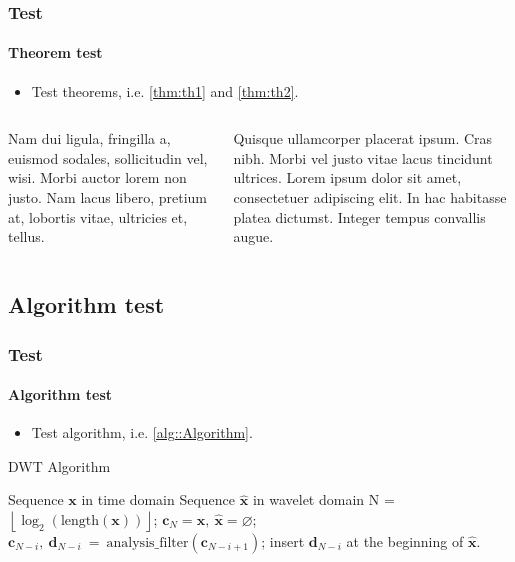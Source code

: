 \documentclass[aspectratio=169,hyperref={implicit=true}]{beamer}
\begin{document}
\begin{frame}

\frametitle{Test}
\framesubtitle{Theorem test}

\begin{itemize}
  \item Test theorems, i.e. \cref{thm:th1} and \cref{thm:th2}.
\end{itemize}

\begin{columns}
  \begin{column}{.44\textwidth}
    \begin{theorem} \label{thm:th1}
      Nam dui ligula, fringilla a, euismod
      sodales, sollicitudin vel, wisi. Morbi
      auctor lorem non justo. Nam lacus
      libero, pretium at, lobortis vitae,
      ultricies et, tellus.
    \end{theorem}
  \end{column}
  \begin{column}{.52\textwidth}
    \begin{theorem} \label{thm:th2}
      Quisque ullamcorper placerat ipsum.
      Cras nibh. Morbi vel justo vitae lacus
      tincidunt ultrices. Lorem ipsum dolor
      sit amet, consectetuer adipiscing elit.
      In hac habitasse platea dictumst.
      Integer tempus convallis augue.
    \end{theorem}
  \end{column}
\end{columns}

\end{frame}

\subsection{Algorithm test}

\begin{frame}

\frametitle{Test}
\framesubtitle{Algorithm test}

\begin{itemize}
  \item Test algorithm, i.e. \cref{alg::Algorithm}.
\end{itemize}

\begin{algorithm}[H]
  \caption{DWT Algorithm}
  \label{alg::Algorithm}
  \begin{algorithmic}[1]
    \REQUIRE Sequence $\mathbf{x}$ in time domain
    \ENSURE Sequence $\hat{\mathbf{x}}$ in wavelet domain
    \STATE N = $\left\lfloor \log_2 (\mathrm{length}(\mathbf{x})) \right\rfloor$;
    \STATE $\mathbf{c}_{N} = \mathbf{x},~ \hat{\mathbf{x}} = \varnothing$;
    \STATE $\mathbf{c}_{N-i},~\mathbf{d}_{N-i}~=~\mathrm{analysis\_filter}(\mathbf{c}_{N-i+1})$;
    \STATE insert $\mathbf{d}_{N-i}$ at the beginning of $\hat{\mathbf{x}}$.
    \ENDFOR
  \end{algorithmic}
\end{algorithm}
\end{frame}
\end{document}
